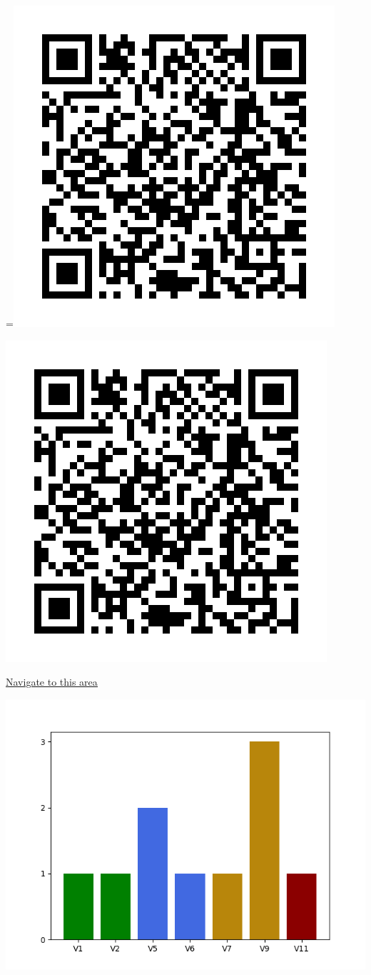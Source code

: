 \raggedcolumns
\begin{multicols}{2}
=\hbox{\includegraphics[width=0.45\linewidth]{./maps/qr//Pink Tag Boulders_qr.png}}%
\begin{center}
\includegraphics[width=0.45\linewidth]{./maps/qr//Pink Tag Boulders_qr.png}
\end{center}
\begin{center}
\underline{\textcolor{blue}{\href{http://maps.google.com/maps?q=44.43998124232581,-122.57539325959186}{Navigate to this area}}}
\end{center}


\includegraphics[width=\linewidth]{./maps/plots//Pink Tag Boulders.png}
\end{multicols}
